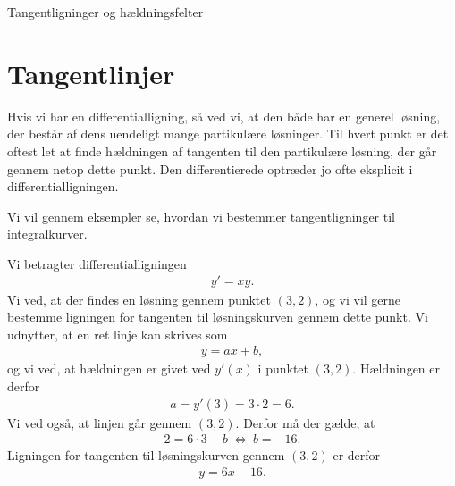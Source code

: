 \begin{center}
\Huge
Tangentligninger og hældningsfelter
\end{center}


\section*{Tangentlinjer}

Hvis vi har en differentialligning, så ved vi, at den både har en generel løsning, der består af dens uendeligt mange partikulære løsninger. Til hvert punkt er det oftest let at finde hældningen af tangenten til den partikulære løsning, der går gennem netop dette punkt. Den differentierede optræder jo ofte eksplicit i differentialligningen. 

Vi vil gennem eksempler se, hvordan vi bestemmer tangentligninger til integralkurver. 

\begin{exa}
	Vi betragter differentialligningen 
	\begin{align*}
		y' = xy. 
	\end{align*}
	Vi ved, at der findes en løsning gennem punktet $(3,2)$, og vi vil gerne bestemme ligningen for tangenten til løsningskurven gennem dette punkt. Vi udnytter, at
	en ret linje kan skrives som 
	\begin{align*}
		y = ax+b,
	\end{align*}
	og vi ved, at hældningen er givet ved $y'(x)$ i punktet $(3,2)$. Hældningen er derfor
	\begin{align*}
		a = y'(3) = 3\cdot 2 = 6.
	\end{align*}
	Vi ved også, at linjen går gennem $(3,2)$. Derfor må der gælde, at 
	\begin{align*}
		2 = 6\cdot 3 + b \ \Leftrightarrow \  b =-16. 
	\end{align*}
	Ligningen for tangenten til løsningskurven gennem $(3,2)$ er derfor
	\begin{align*}
		y = 6x-16.
	\end{align*}
\end{exa}


